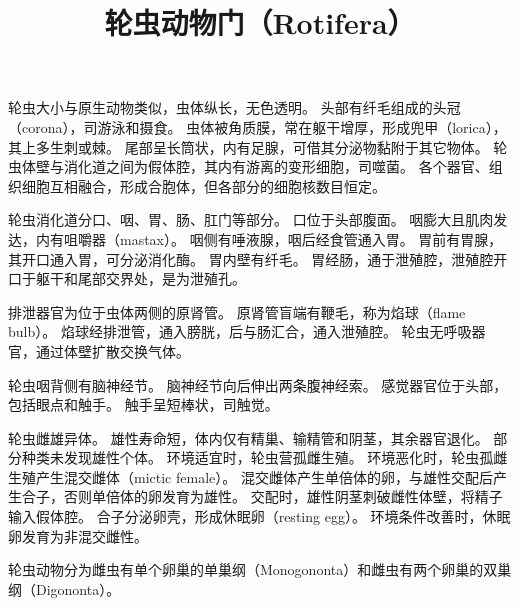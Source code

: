 \documentclass[11pt]{article}
\title{轮虫动物门（Rotifera）}
\date{}
\begin{document}
  \maketitle

  \linenumbers
轮虫大小与原生动物类似，虫体纵长，无色透明。
头部有纤毛组成的头冠（corona），司游泳和摄食。
虫体被角质膜，常在躯干增厚，形成兜甲（lorica），其上多生刺或棘。
尾部呈长筒状，内有足腺，可借其分泌物黏附于其它物体。
轮虫体壁与消化道之间为假体腔，其内有游离的变形细胞，司噬菌。
各个器官、组织细胞互相融合，形成合胞体，但各部分的细胞核数目恒定。

\newline

轮虫消化道分口、咽、胃、肠、肛门等部分。
口位于头部腹面。
咽膨大且肌肉发达，内有咀嚼器（mastax）。
咽侧有唾液腺，咽后经食管通入胃。
胃前有胃腺，其开口通入胃，可分泌消化酶。
胃内壁有纤毛。
胃经肠，通于泄殖腔，泄殖腔开口于躯干和尾部交界处，是为泄殖孔。

\newline

排泄器官为位于虫体两侧的原肾管。
原肾管盲端有鞭毛，称为焰球（flame bulb）。
焰球经排泄管，通入膀胱，后与肠汇合，通入泄殖腔。
轮虫无呼吸器官，通过体壁扩散交换气体。

\newline

轮虫咽背侧有脑神经节。
脑神经节向后伸出两条腹神经索。
感觉器官位于头部，包括眼点和触手。
触手呈短棒状，司触觉。

\newline

轮虫雌雄异体。
雄性寿命短，体内仅有精巢、输精管和阴茎，其余器官退化。
部分种类未发现雄性个体。
环境适宜时，轮虫营孤雌生殖。
环境恶化时，轮虫孤雌生殖产生混交雌体（mictic female）。
混交雌体产生单倍体的卵，与雄性交配后产生合子，否则单倍体的卵发育为雄性。
交配时，雄性阴茎刺破雌性体壁，将精子输入假体腔。
合子分泌卵壳，形成休眠卵（resting egg）。
环境条件改善时，休眠卵发育为非混交雌性。

\newline

轮虫动物分为雌虫有单个卵巢的单巢纲（Monogononta）和雌虫有两个卵巢的双巢纲（Digononta）。
\end{document}
